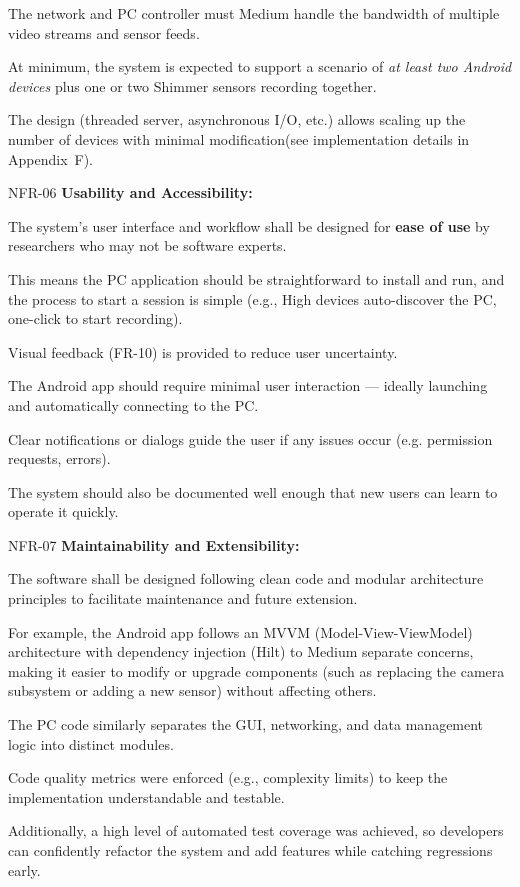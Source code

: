 The network and PC controller must Medium handle the bandwidth of multiple video streams and sensor feeds.

At minimum, the system is expected to support a scenario of \textit{at least two Android devices} plus one or two Shimmer sensors recording together.

The design (threaded server, asynchronous I/O, etc.) allows scaling up the number of devices with minimal modification(see implementation details in Appendix~F).

NFR-06 \textbf{Usability and Accessibility:}

The system's user interface and workflow shall be designed for \textbf{ease of use}
 by researchers who may not be software experts.

This means the PC application should be straightforward to install and run, and the process to start a session is simple (e.g., High devices auto-discover the PC, one-click to start recording).

Visual feedback (FR-10) is provided to reduce user uncertainty.

The Android app should require minimal user interaction --- ideally launching and automatically connecting to the PC.

Clear notifications or dialogs guide the user if any issues occur (e.g. permission requests, errors).

The system should also be documented well enough that new users can learn to operate it quickly.

NFR-07 \textbf{Maintainability and Extensibility:}

The software shall be designed following clean code and modular architecture principles to facilitate maintenance and future extension.

For example, the Android app follows an MVVM (Model-View-ViewModel) architecture with dependency injection (Hilt) to Medium separate concerns, making it easier to modify or upgrade components (such as replacing the camera subsystem or adding a new sensor) without affecting others.

The PC code similarly separates the GUI, networking, and data management logic into distinct modules.

Code quality metrics were enforced (e.g., complexity limits) to keep the implementation understandable and testable.

Additionally, a high level of automated test coverage was achieved, so developers can confidently refactor the system and add features while catching regressions early.

